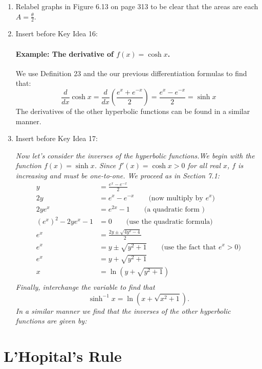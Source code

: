 \documentclass[12pt]{report}
\begin{document}
\begin{enumerate}
\item Relabel graphs in Figure 6.13 on page 313 to be clear that the areas are each $A=\frac\theta2$.

\item Insert before Key Idea 16:

{\slshape \paragraph{Example: The derivative of $f(x)=\cosh x$.} We use Definition 23 and the our previous differentiation formulas to find that:
\[\frac d{dx}\cosh x=\frac d{dx}\left( \frac{e^x+e^{-x}}2\right)=\frac{e^x-e^{-x}}2=\sinh x\]
The derivatives of the other hyperbolic functions can be found in a similar manner.
}
\item Insert before Key Idea 17: 

{\slshape Now let's consider the inverses of the hyperbolic functions.We begin with the function $f(x)=\sinh x$. Since $f'(x)=\cosh x>0$ for all real $x$, $f$ is increasing and must be one-to-one. We proceed as in Section 7.1:
\begin{equation*}
\begin{split}
y&=\frac{e^x-e^{-x}}2\\
2y&=e^x-e^{-x} \qquad\text{(now multiply by $e^x$)}\\
2ye^x&=e^{2x}-1 \qquad\text{(a quadratic form )}\\
\left(e^x\right)^2-2ye^x-1&=0 \qquad\text{(use the quadratic formula)}\\
e^x&=\frac{2y\pm\sqrt{4y^2-4}}2\\
e^x&=y\pm\sqrt{y^2+1} \qquad\text{(use the fact that $e^x>0$)}\\
e^x&=y+\sqrt{y^2+1}\\
x&=\ln(y+\sqrt{y^2+1})\\
\end{split}
\end{equation*}
Finally, interchange the variable to find that \[\sinh^{-1} x=\ln(x+\sqrt{x^2+1}).\] In a similar manner we find that the inverses of the other hyperbolic functions are given by:}
\end{enumerate}

\section{L'Hopital's Rule}
\end{document}
